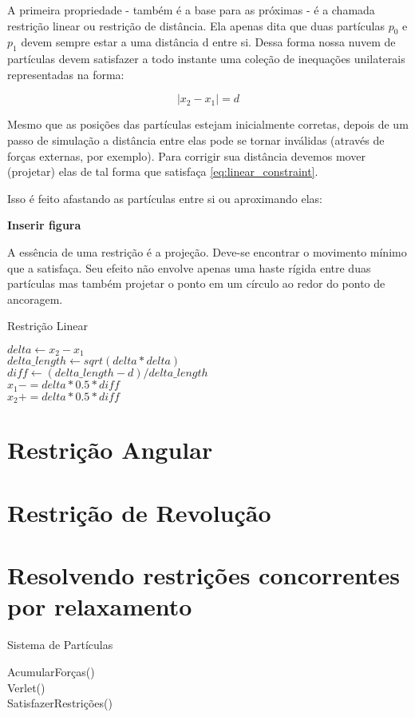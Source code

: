 A primeira propriedade - também é a base para as próximas - é a chamada restrição linear ou restrição de distância. Ela apenas dita que duas partículas $p_0$ e $p_1$ devem sempre estar a uma distância d entre si. Dessa forma nossa nuvem de partículas devem satisfazer a todo instante uma coleção de inequações unilaterais representadas na forma:

\begin{equation}
	|x_2 - x_1| = d
	\label{eq:linear_constraint}
\end{equation}

Mesmo que as posições das partículas estejam inicialmente corretas, depois de um passo de simulação a distância entre elas pode se tornar inválidas (através de forças externas, por exemplo). Para corrigir sua distância devemos mover (projetar) elas de tal forma que satisfaça \ref{eq:linear_constraint}.

Isso é feito afastando as partículas entre si ou aproximando elas:

\textbf{Inserir figura}

A essência de uma restrição é a projeção. Deve-se encontrar o movimento mínimo que a satisfaça. Seu efeito não envolve apenas uma haste rígida entre duas partículas mas também projetar o ponto em um círculo ao redor do ponto de ancoragem.

\begin{algorithm}[H]
	\caption{Restrição Linear}
	$delta \leftarrow x_2 - x_1$ \\
	$delta\_length \leftarrow sqrt(delta * delta)$ \\
	$diff \leftarrow (delta\_length - d)/delta\_length$ \\
	$x_1 -= delta*0.5*diff$ \\
	$x_2 += delta*0.5*diff$ \\
\end{algorithm}

\section{Restrição Angular}

\section{Restrição de Revolução}

\section{Resolvendo restrições concorrentes por relaxamento}

\begin{algorithm}[H]
	\caption{Sistema de Partículas}
	AcumularForças() \\
	Verlet() \\
	SatisfazerRestrições() \\
\end{algorithm}
